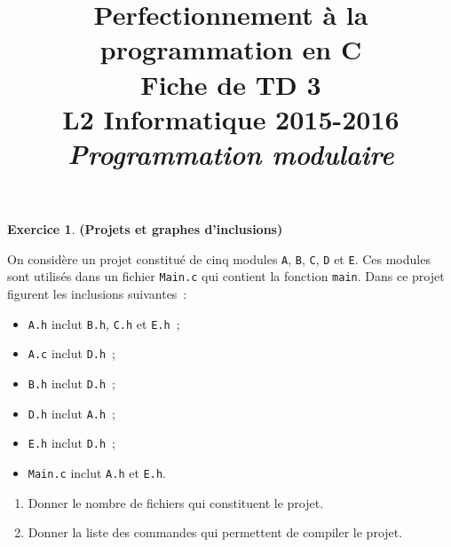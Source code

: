 \documentclass[12pt]{article}
\date{}
\title{{\bf Perfectionnement à la programmation en {\sf C}} \\
    Fiche de TD 3 \\
    {\small L2 Informatique 2015-2016} \\
    {\it \small Programmation modulaire}}
\theoremstyle{definition}
\newtheorem{Exercice}{Exercice}
\newcommand{\Sol}[1]{}
\begin{document}
\maketitle

\begin{Exercice} {\bf (Projets et graphes d'inclusions)} \smallskip

    On considère un projet constitué de cinq modules {\tt A}, {\tt B},
    {\tt C}, {\tt D} et {\tt E}. Ces modules sont utilisés dans un
    fichier {\tt Main.c} qui contient la fonction {\tt main}. Dans ce
    projet figurent les inclusions suivantes~:
    \begin{multicols}{2}
    \begin{itemize}
        \item {\tt A.h} inclut {\tt B.h}, {\tt C.h} et {\tt E.h}~;
        \item {\tt A.c} inclut {\tt D.h}~;
        \item {\tt B.h} inclut {\tt D.h}~;
        \item {\tt D.h} inclut {\tt A.h}~;
        \item {\tt E.h} inclut {\tt D.h}~;
        \item {\tt Main.c} inclut {\tt A.h} et {\tt E.h}.
    \end{itemize}
    \end{multicols}

    \begin{enumerate}
        \item Donner le nombre de fichiers qui constituent le projet.

        \Sol{$11$ fichiers ($2 \times 5$ pour les modules et $1$ pour le
        fichier principal).}
        \smallskip

        \item Donner la liste des commandes qui permettent de compiler
        le projet.

        \Sol{
        {\tt gcc -c A.c} \\
        {\tt gcc -c B.c} \\
        {\tt gcc -c C.c} \\
        {\tt gcc -c D.c} \\
        {\tt gcc -c E.c} \\
        {\tt gcc -c Main.c} \\
        {\tt gcc Main.o A.o B.o C.o D.o E.o}}
        \smallskip


\end{enumerate}
\end{Exercice}
\end{document}
